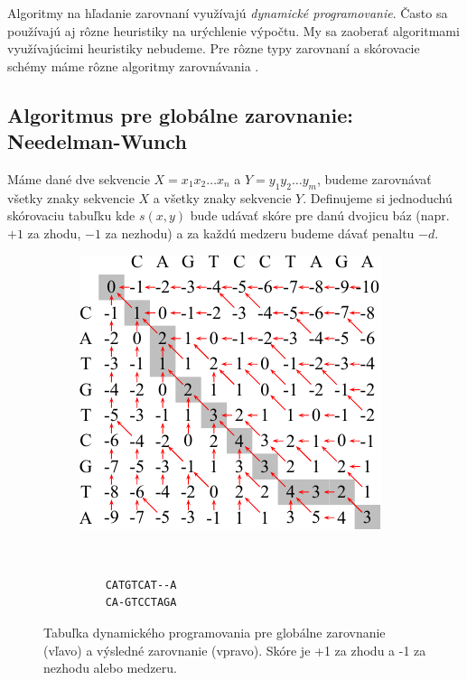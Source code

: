 Algoritmy na hľadanie zarovnaní využívajú \textit{dynamické programovanie}.
Často sa používajú aj rôzne heuristiky na urýchlenie výpočtu.
My sa zaoberať algoritmami využívajúcimi heuristiky nebudeme. Pre rôzne typy zarovnaní a skórovacie schémy máme rôzne algoritmy zarovnávania \cite{durbin, skripta}.

\subsection{Algoritmus pre globálne zarovnanie: Needelman-Wunch}
\label{subsec:global-alignment}
Máme dané dve sekvencie $X = x_1x_2\dots x_n$ a $Y = y_1y_2\dots y_m$, budeme zarovnávať všetky znaky sekvencie $X$ a všetky znaky sekvencie $Y$.
Definujeme si jednoduchú skórovaciu tabuľku kde $s(x, y)$ bude udávať skóre pre danú dvojicu báz (napr. $+1$ za zhodu, $-1$ za nezhodu) a za každú medzeru budeme dávať penaltu $-d$.


\begin{figure}[htp]
    \centering
    \begin{subfigure}[m]{0.5\textwidth}
    \centering
    \includegraphics[width=\textwidth]{images/global_alignment}
    \end{subfigure}
    ~
    \begin{subfigure}[m]{0.3\textwidth}
    \centering
    \begin{verbatim}
    CATGTCAT--A
    CA-GTCCTAGA
    \end{verbatim}
    \end{subfigure}
    \caption[Tabuľka dyn. programovania pre  globálne zarovnanie]{Tabuľka dynamického programovania pre  globálne zarovnanie (vľavo) a výsledné zarovnanie (vpravo). Skóre je +1 za zhodu a -1 za nezhodu alebo medzeru.}
    \label{fig:global-align}
\end{figure}

